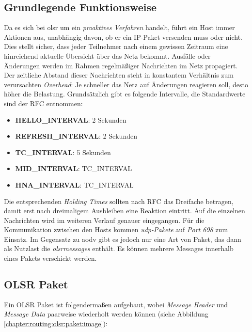 \subsection{Grundlegende Funktionsweise}
\label{chapter:routing:olsr:funktion}

Da es sich bei \gls{olsr} um ein \textit{proaktives Verfahren} handelt, führt ein Host immer Aktionen aus, unabhängig davon, ob er ein IP-Paket versenden muss oder nicht. Dies stellt sicher, dass jeder Teilnehmer nach einem gewissen Zeitraum eine hinreichend aktuelle Übersicht über das Netz bekommt. Ausfälle oder Änderungen werden im Rahmen regelmäßiger Nachrichten im Netz propagiert. Der zeitliche Abstand dieser Nachrichten steht in konstantem Verhältnis zum verursachten \textit{Overhead}: Je schneller das Netz auf Änderungen reagieren soll, desto höher die Belastung. Grundsätzlich gibt es folgende Intervalle, die Standardwerte sind der RFC entnommen:

\begin{itemize}
\item \textbf{HELLO\_INTERVAL}: 2 Sekunden
\item \textbf{REFRESH\_INTERVAL}: 2 Sekunden
\item \textbf{TC\_INTERVAL}: 5 Sekunden
\item \textbf{MID\_INTERVAL}: TC\_INTERVAL
\item \textbf{HNA\_INTERVAL}: TC\_INTERVAL
\end{itemize}

Die entsprechenden \textit{Holding Times} sollten nach RFC das Dreifache betragen, damit erst nach dreimaligem Ausbleiben eine Reaktion eintritt. Auf die einzelnen Nachrichten wird im weiteren Verlauf genauer eingegangen. Für die Kommunikation zwischen den Hosts kommen \textit{\gls{udp}-Pakete} auf \textit{Port 698} zum Einsatz. Im Gegensatz zu \gls{aodv} gibt es jedoch nur eine Art von Paket, das dann als Nutzlast die \textit{\glspl{olsrmessage}} enthält. Es können mehrere Messages innerhalb eines Pakets verschickt werden. %

\subsection{OLSR Paket}
\label{chapter:routing:olsr:paket}

Ein OLSR Paket ist folgendermaßen aufgebaut, wobei \textit{Message Header} und \textit{Message Data} paarweise wiederholt werden können (siehe Abbildung \ref{chapter:routing:olsr:paket:image}):

